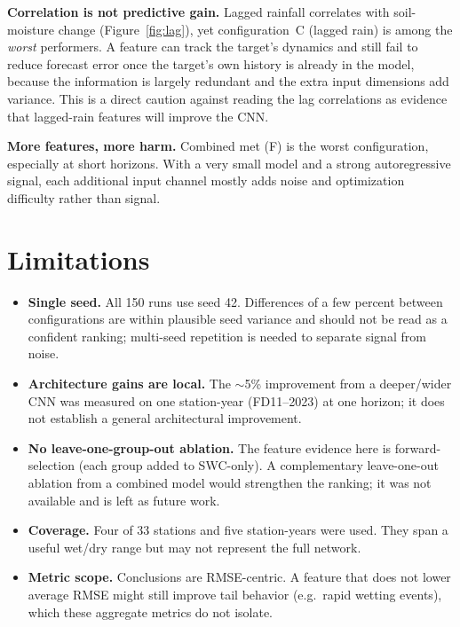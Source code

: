 \documentclass[11pt]{article}
\begin{document}
\textbf{Correlation is not predictive gain.} Lagged rainfall correlates with
soil-moisture change (Figure~\ref{fig:lag}), yet configuration~C (lagged rain)
is among the \emph{worst} performers. A feature can track the target's dynamics
and still fail to reduce forecast error once the target's own history is already
in the model, because the information is largely redundant and the extra input
dimensions add variance. This is a direct caution against reading the lag
correlations as evidence that lagged-rain features will improve the CNN.

\textbf{More features, more harm.} Combined met (F) is the worst configuration,
especially at short horizons. With a very small model and a strong autoregressive
signal, each additional input channel mostly adds noise and optimization
difficulty rather than signal.

\section{Limitations}

\begin{itemize}
    \item \textbf{Single seed.} All 150 runs use seed 42. Differences of a few
    percent between configurations are within plausible seed variance and should
    not be read as a confident ranking; multi-seed repetition is needed to
    separate signal from noise.
    \item \textbf{Architecture gains are local.} The $\sim$5\% improvement from a
    deeper/wider CNN was measured on one station-year (FD11--2023) at one horizon;
    it does not establish a general architectural improvement.
    \item \textbf{No leave-one-group-out ablation.} The feature evidence here is
    forward-selection (each group added to SWC-only). A complementary
    leave-one-out ablation from a combined model would strengthen the ranking;
    it was not available and is left as future work.
    \item \textbf{Coverage.} Four of 33 stations and five station-years were used.
    They span a useful wet/dry range but may not represent the full network.
    \item \textbf{Metric scope.} Conclusions are RMSE-centric. A feature that does
    not lower average RMSE might still improve tail behavior (e.g.\ rapid wetting
    events), which these aggregate metrics do not isolate.
\end{itemize}
\end{document}

